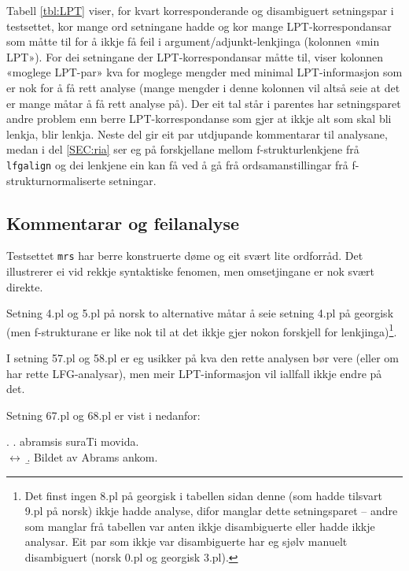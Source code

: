 \documentclass[11pt,a4paper,oneside,draft]{book}
\begin{document}
Tabell \ref{tbl:LPT} viser, for kvart korresponderande og disambiguert
setningspar i testsettet, kor mange ord setningane hadde og kor mange
LPT-korrespondansar som måtte til for å ikkje få feil i
argument/adjunkt-lenkjinga (kolonnen «min LPT»). For dei setningane
der LPT-korrespondansar måtte til, viser kolonnen «moglege LPT-par»
kva for moglege mengder med minimal LPT-informasjon som er nok for å
få rett analyse (mange mengder i denne kolonnen vil altså seie at det
er mange måtar å få rett analyse på).  Der eit tal står i parentes har
setningsparet andre problem enn berre LPT-korrespondanse som gjer at
ikkje alt som skal bli lenkja, blir lenkja. Neste del gir eit par
utdjupande kommentarar til analysane, medan i del \ref{SEC:ria} ser eg
på forskjellane mellom f-strukturlenkjene frå \texttt{lfgalign} og dei
lenkjene ein kan få ved å gå frå ordsamanstillingar frå
f-strukturnormaliserte setningar.

\subsection{Kommentarar og feilanalyse}
\label{sec-5.3.1}

\label{SEC:feilanalyse}

Testsettet \texttt{mrs} har berre konstruerte døme og eit svært lite
ordforråd. Det illustrerer ei vid rekkje syntaktiske fenomen, men
omsetjingane er nok svært direkte.

Setning 4.pl og 5.pl på norsk to alternative måtar å seie setning 4.pl
på georgisk (men f-strukturane er like nok til at det ikkje gjer nokon
forskjell for lenkjinga)\footnote{Det finst ingen 8.pl på georgisk i tabellen sidan denne (som
        hadde tilsvart 9.pl på norsk) ikkje hadde analyse, difor
        manglar dette setningsparet -- andre som manglar frå tabellen
        var anten ikkje disambiguerte eller hadde ikkje analysar. Eit
        par som ikkje var disambiguerte har eg sjølv manuelt
        disambiguert (norsk 0.pl og georgisk 3.pl). }.

I setning 57.pl og 58.pl er eg usikker på kva den rette analysen bør
vere (eller om har rette LFG-analysar), men meir LPT-informasjon vil
iallfall ikkje endre på det.

Setning 67.pl og 68.pl er vist i \Next nedanfor:

\ex. \a. abramsis suraTi movida.\\
     $\leftrightarrow$
     \b. Bildet av Abrams ankom.
\end{document}
